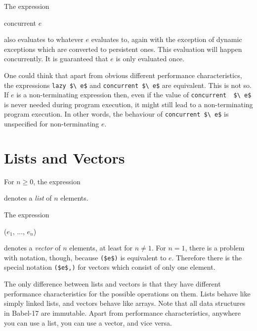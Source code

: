 \documentclass[11pt]{amsart}
\newcommand{\babelsrc}[1] {\lstinline!#1!}
\begin{document}
The expression
\begin{babellisting}
concurrent $e$
\end{babellisting}
also evaluates to whatever $e$ evaluates to, again with the exception of dynamic exceptions which are converted to persistent ones. This evaluation will happen concurrently.  
It is guaranteed that $e$ is only evaluated once.

One could think that apart from obvious different performance characteristics, the expressions \babelsrc{lazy $\ e$} and \babelsrc{concurrent $\ e$} are equivalent. This is not so.
If $e$ is a non-terminating expression then, even if  the value of  \babelsrc{concurrent  $\ e$} is never needed during program execution, it might still lead to a non-terminating program execution. In other words, the behaviour of \babelsrc{concurrent $\ e$}  is unspecified for non-terminating $e$.

\section{Lists and Vectors}
For $n \ge 0$, the expression
\begin{babellisting}
[$e_1$, $\ldots$, $e_n$]
\end{babellisting}
denotes a \emph{list} of $n$ elements. 

The expression
\begin{babellisting}
($e_1$, $\ldots$, $e_n$)
\end{babellisting}
denotes a  \emph{vector} of $n$ elements, at least for $n \neq 1$. 
For $n=1$, there is a problem with notation, though, because \babelsrc{($e$)}  is equivalent to $e$. Therefore there is the special notation \babelsrc{($e$,)} for vectors which consist of only one element.

The only difference between lists and vectors is that they have different performance characteristics for the possible operations on them. Lists behave like simply linked lists, and vectors behave like arrays. Note that all data structures in Babel-17 are immutable. Apart from performance characteristics, anywhere you can use a list, you can use a vector, and vice versa. 
\end{document}
